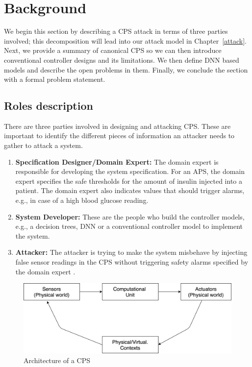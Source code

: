\chapter{Background}
\label{background}

We begin this section by describing a \ac{CPS} attack in terms of three parties involved; this decomposition will lead into our attack model in Chapter~\ref{attack}.
Next, we provide a summary of canonical \ac{CPS} so we can then introduce conventional controller designs and its limitations. 
We then define \ac{DNN} based models and describe the open problems in them. 
Finally, we conclude the section with a formal problem statement. 


\section{Roles description}
There are three parties involved in designing and attacking \ac{CPS}. These are important to identify the different pieces of information an attacker needs to gather to attack a system.

\begin{enumerate}
	\item \textbf{Specification Designer/Domain Expert:} The domain expert is responsible for developing the system specification. 
	For an \ac{APS}, the domain expert specifies the safe thresholds for the amount of insulin injected into a patient. The domain expert also indicates values that should trigger alarms, e.g., in case of a high blood glucose reading.
	\item \textbf{System Developer:} These are the people who build the controller models, e.g., a decision trees, \ac{DNN} or a conventional controller model to implement the system.
	\item \textbf{Attacker:} The attacker is trying to make the system misbehave by injecting false sensor readings in the \ac{CPS} without triggering safety alarms specified by the domain expert . 
\end{enumerate}

\begin{figure}
	\centering
	\includegraphics[width=0.7\linewidth]{Images/Systemsdescription}
	\caption{Architecture of a CPS}
	\label{fig:systemsdescription}
\end{figure}

